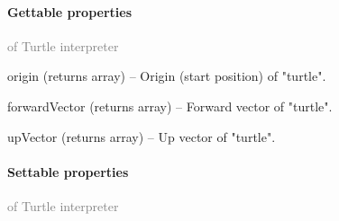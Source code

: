 	\paragraph{Gettable properties}\textcolor{gray}{of Turtle interpreter}
	\begin{description*}
		\item[origin]
		(returns array)
			-- Origin (start position) of "turtle".
		\item[forwardVector]
		(returns array)
			-- Forward vector of "turtle".
		\item[upVector]
		(returns array)
			-- Up vector of "turtle".
	\end{description*}
	\paragraph{Settable properties}\textcolor{gray}{of Turtle interpreter}
